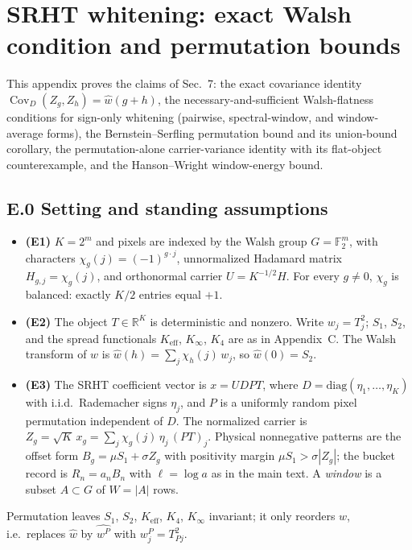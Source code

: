\section{SRHT whitening: exact Walsh condition and permutation bounds}

This appendix proves the claims of Sec.~7: the exact covariance identity $\operatorname{Cov}_D(Z_g,Z_h)=\hat w(g+h)$, the necessary-and-sufficient Walsh-flatness conditions for sign-only whitening (pairwise, spectral-window, and window-average forms), the Bernstein--Serfling permutation bound and its union-bound corollary, the permutation-alone carrier-variance identity with its flat-object counterexample, and the Hanson--Wright window-energy bound.

\subsection{E.0 Setting and standing assumptions}

\begin{itemize}
\item \textbf{(E1)} $K=2^m$ and pixels are indexed by the Walsh group $G=\mathbb{F}_2^m$, with characters $\chi_g(j)=(-1)^{g\cdot j}$, unnormalized Hadamard matrix $H_{g,j}=\chi_g(j)$, and orthonormal carrier $U=K^{-1/2}H$. For every $g\neq 0$, $\chi_g$ is balanced: exactly $K/2$ entries equal $+1$.
\item \textbf{(E2)} The object $T\in\mathbb{R}^K$ is deterministic and nonzero. Write $w_j=T_j^2$; $S_1$, $S_2$, and the spread functionals $K_{\mathrm{eff}}$, $K_\infty$, $K_4$ are as in Appendix~C. The Walsh transform of $w$ is $\hat w(h)=\sum_j \chi_h(j)\,w_j$, so $\hat w(0)=S_2$.
\item \textbf{(E3)} The SRHT coefficient vector is $x=UDPT$, where $D=\mathrm{diag}(\eta_1,\dots,\eta_K)$ with i.i.d.\ Rademacher signs $\eta_j$, and $P$ is a uniformly random pixel permutation independent of $D$. The normalized carrier is $Z_g=\sqrt{K}\,x_g=\sum_j \chi_g(j)\,\eta_j\,(PT)_j$. Physical nonnegative patterns are the offset form $B_g=\mu S_1+\sigma Z_g$ with positivity margin $\mu S_1>\sigma|Z_g|$; the bucket record is $R_n=a_nB_n$ with $\ell=\log a$ as in the main text. A \emph{window} is a subset $A\subset G$ of $W=|A|$ rows.
\end{itemize}

Permutation leaves $S_1$, $S_2$, $K_{\mathrm{eff}}$, $K_4$, $K_\infty$ invariant; it only reorders $w$, i.e.\ replaces $\hat w$ by $\widehat{w^P}$ with $w^P_j=T^2_{Pj}$.

